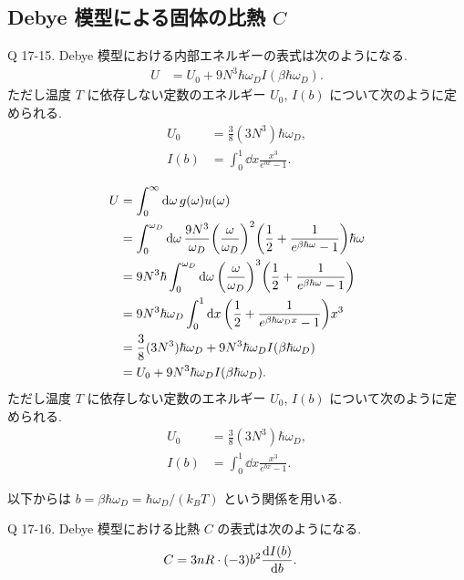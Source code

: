 \documentclass[uplatex,dvipdfmx,a4paper,11pt]{jlreq}
\theoremstyle{definition}
\begin{document}
\subsection{Debye 模型による固体の比熱 $C$}
\begin{itembox}[l]{Q 17-15.}
  Debye 模型における内部エネルギーの表式は次のようになる.
  \begin{align}
    U & = U_0 + 9N^3\hbar\omega_DI(\beta\hbar\omega_D).
  \end{align}
  ただし温度 $T$ に依存しない定数のエネルギー $U_0$, $I(b)$ について次のように定められる.
  \begin{align}
    U_0  & = \frac{3}{8}(3N^3)\hbar\omega_D,       \\
    I(b) & = \int_0^1\dd{x}\frac{x^3}{e^{bx} - 1}.
  \end{align}
\end{itembox}
\begin{align}
  U & = \int_0^\infty\dd{\omega}g(\omega)u(\omega)                                                                                                        \\
    & = \int_0^{\omega_D}\dd{\omega}\frac{9N^3}{\omega_D}\qty(\frac{\omega}{\omega_D})^2\qty(\frac{1}{2} + \frac{1}{e^{\beta\hbar\omega} - 1})\hbar\omega \\
    & = 9N^3\hbar\int_0^{\omega_D}\dd{\omega}\qty(\frac{\omega}{\omega_D})^3\qty(\frac{1}{2} + \frac{1}{e^{\beta\hbar\omega} - 1})                        \\
    & = 9N^3\hbar\omega_D\int_0^1\dd{x}\qty(\frac{1}{2} + \frac{1}{e^{\beta\hbar\omega_Dx} - 1})x^3                                                       \\
    & = \frac{3}{8}(3N^3)\hbar\omega_D + 9N^3\hbar\omega_DI(\beta\hbar\omega_D)                                                                           \\
    & = U_0 + 9N^3\hbar\omega_DI(\beta\hbar\omega_D).
\end{align}
ただし温度 $T$ に依存しない定数のエネルギー $U_0$, $I(b)$ について次のように定められる.
\begin{align}
  U_0  & = \frac{3}{8}(3N^3)\hbar\omega_D,       \\
  I(b) & = \int_0^1\dd{x}\frac{x^3}{e^{bx} - 1}.
\end{align}

以下からは $b = \beta\hbar\omega_D = \hbar\omega_D/(k_BT)$ という関係を用いる.

\begin{itembox}[l]{Q 17-16.}
  Debye 模型における比熱 $C$ の表式は次のようになる.
  \begin{align}
    C & = 3nR\cdot(-3)b^2\dv{I(b)}{b}.
  \end{align}
\end{itembox}
\end{document}
